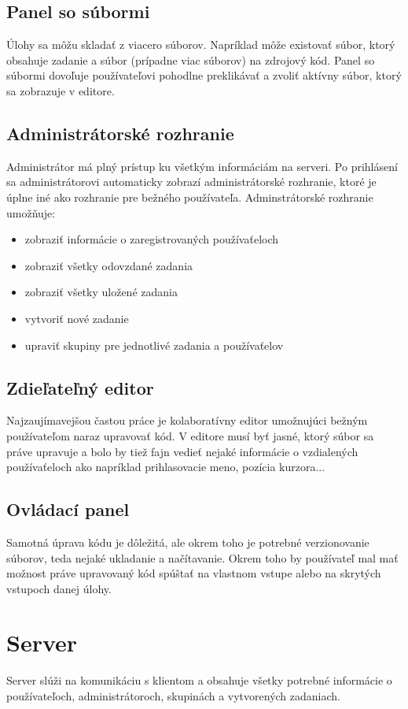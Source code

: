 \subsection{Panel so súbormi}
Úlohy sa môžu skladať z viacero súborov. Napríklad môže existovať súbor, ktorý
obsahuje zadanie a súbor (prípadne viac súborov) na zdrojový kód. Panel so súbormi dovoľuje
používateľovi pohodlne preklikávať a zvoliť aktívny súbor, ktorý sa zobrazuje v editore.

\subsection{Administrátorské rozhranie}
Administrátor má plný prístup ku všetkým informáciám na serveri. Po prihlásení sa administrátorovi
automaticky zobrazí administrátorské rozhranie, ktoré je úplne iné ako rozhranie pre bežného
používateľa. Adminstrátorské rozhranie umožňuje:
\begin{itemize}
\item zobraziť informácie o zaregistrovaných používaťeloch
\item zobraziť všetky odovzdané zadania
\item zobraziť všetky uložené zadania
\item vytvoriť nové zadanie
\item upraviť skupiny pre jednotlivé zadania a používaťelov
\end{itemize}

\subsection{Zdieľateľný editor}
Najzaujímavejšou častou práce je kolaboratívny editor umožnujúci bežným používateľom naraz
upravovať kód. V editore musí byť jasné, ktorý súbor sa práve upravuje a bolo by
tiež fajn vedieť nejaké informácie o vzdialených používaťeloch ako napríklad prihlasovacie meno, 
pozícia kurzora...

\subsection{Ovládací panel}
Samotná úprava kódu je dôležitá, ale okrem toho je potrebné verzionovanie
súborov, teda nejaké ukladanie a načítavanie. Okrem toho by používateľ mal mať možnost práve
upravovaný kód spúštať na vlastnom vstupe alebo na skrytých vstupoch danej úlohy.


\section{Server}
Server slúži na komunikáciu s klientom a obsahuje všetky potrebné informácie o používateľoch,
administrátoroch, skupinách a vytvorených zadaniach.


